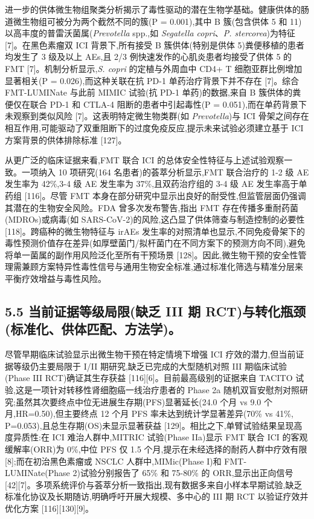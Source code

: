 进一步的供体微生物组聚类分析揭示了毒性驱动的潜在生物学基础。健康供体的肠道微生物组可被分为两个截然不同的簇(P = 0.001),其中 B 簇(包含供体 5 和 11)以高丰度的普雷沃菌属(\emph{Prevotella} spp.,如 \emph{Segatella copri}、\emph{P. stercorea})为特征 {[}7{]}。在黑色素瘤双 ICI 背景下,所有接受 B 簇供体(特别是供体 5)粪便移植的患者均发生了 3 级及以上 AEs,且 2/3 例快速发作的心肌炎患者均接受了供体 5 的 FMT {[}7{]}。机制分析显示,\emph{S. copri} 的定植与外周血中 CD4+ T 细胞亚群比例增加显著相关(P = 0.026),而这种关联在抗 PD-1 单药治疗背景下并不存在 {[}7{]}。综合 FMT-LUMINate 与此前 MIMIC 试验(抗 PD-1 单药)的数据,来自 B 簇供体的粪便仅在联合 PD-1 和 CTLA-4 阻断的患者中引起毒性(P = 0.051),而在单药背景下未观察到类似风险 {[}7{]}。这表明特定微生物类群(如 \emph{Prevotella})与 ICI 骨架之间存在相互作用,可能驱动了双重阻断下的过度免疫反应,提示未来试验必须建立基于 ICI 方案背景的供体排除标准 {[}127{]}。

从更广泛的临床证据来看,FMT 联合 ICI 的总体安全性特征与上述试验观察一致。一项纳入 10 项研究(164 名患者)的荟萃分析显示,FMT 联合治疗的 1-2 级 AE 发生率为 42\%,3-4 级 AE 发生率为 37\%,且双药治疗组的 3-4 级 AE 发生率高于单药组 {[}116{]}。尽管 FMT 本身在部分研究中显示出良好的耐受性,但监管层面仍强调其潜在的生物安全风险。FDA 曾多次发布警告,指出 FMT 存在传播多重耐药菌(MDROs)或病毒(如 SARS-CoV-2)的风险,这凸显了供体筛查与制造控制的必要性 {[}118{]}。跨癌种的微生物特征与 irAEs 发生率的对照清单也显示,不同免疫骨架下的毒性预测价值存在差异(如厚壁菌门/拟杆菌门在不同方案下的预测方向不同),避免将单一菌属的副作用风险泛化至所有干预场景 {[}128{]}。因此,微生物干预的安全性管理需兼顾方案特异性毒性信号与通用生物安全标准,通过标准化筛选与精准分层来平衡疗效增益与毒性风险。

\subsection{5.5 当前证据等级局限(缺乏 III 期 RCT)与转化瓶颈(标准化、供体匹配、方法学)。}\label{ux5f53ux524dux8bc1ux636eux7b49ux7ea7ux5c40ux9650ux7f3aux4e4f-iii-ux671f-rctux4e0eux8f6cux5316ux74f6ux9888ux6807ux51c6ux5316ux4f9bux4f53ux5339ux914dux65b9ux6cd5ux5b66}

尽管早期临床试验显示出微生物干预在特定情境下增强 ICI 疗效的潜力,但当前证据等级仍主要局限于 I/II 期研究,缺乏已完成的大型随机对照 III 期临床试验(Phase III RCT)确证其生存获益 {[}116{]}{[}6{]}。目前最高级别的证据来自 TACITO 试验,这是一项针对转移性肾细胞癌一线治疗患者的 Phase 2a 随机双盲安慰剂对照研究;虽然其次要终点中位无进展生存期(PFS)显著延长(24.0 个月 vs 9.0 个月,HR=0.50),但主要终点 12 个月 PFS 率未达到统计学显著差异(70\% vs 41\%, P=0.053),且总生存期(OS)未显示显著获益 {[}129{]}。相比之下,单臂试验结果呈现高度异质性:在 ICI 难治人群中,MITRIC 试验(Phase IIa)显示 FMT 联合 ICI 的客观缓解率(ORR)为 0\%,中位 PFS 仅 1.5 个月,提示在未经选择的耐药人群中疗效有限 {[}8{]};而在初治黑色素瘤或 NSCLC 人群中,MIMic(Phase I)和 FMT-LUMINate(Phase 2)试验分别报告了 65\% 和 75-80\% 的 ORR,显示出正向信号 {[}42{]}{[}7{]}。多项系统评价与荟萃分析一致指出,现有数据多来自小样本早期试验,缺乏标准化协议及长期随访,明确呼吁开展大规模、多中心的 III 期 RCT 以验证疗效并优化方案 {[}116{]}{[}130{]}{[}9{]}。

